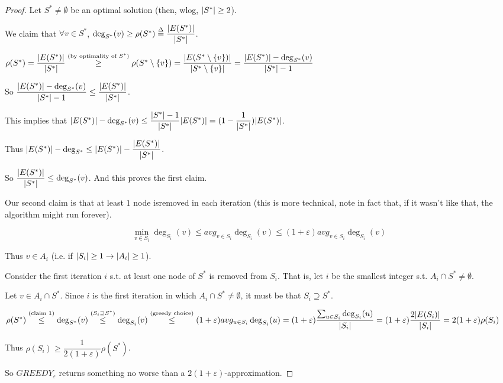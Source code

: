     \begin{proof}
        Let $S^* \neq \emptyset$ be an optimal solution (then, wlog, $\vert S^* \vert \geq 2$).

        We claim that $\forall v \in S^*$, $\deg_{S^*}(v) \geq \rho(S^*) \overset{\Delta}{=} \dfrac{\vert E(S^*) \vert}{\vert S^* \vert}$.

        $\rho(S^*) = \dfrac{\vert E(S^*) \vert}{\vert S^* \vert} \overset{(\text{by optimality of }S^*)}{\geq} \rho(S^* \setminus \{v\}) = 
        \dfrac{\vert E(S^* \setminus \{v\}) \vert}{\vert S^* \setminus \{v\} \vert} = 
        \dfrac{\vert E(S^*) \vert - \deg_{S^*}(v)}{\vert S^* \vert-1}$

        So $\dfrac{\vert E(S^*) \vert - \deg_{S^*}(v)}{\vert S^* \vert-1} \leq \dfrac{\vert E(S^*) \vert}{\vert S^* \vert}$.

        This implies that $\vert E(S^*) \vert - \deg_{S^*}(v) \leq \dfrac{\vert S^* \vert-1}{\vert S^* \vert} \vert E(S^*) \vert = (1 - \dfrac{1}{\vert S^* \vert}) \vert E(S^*) \vert$.

        Thus $\vert E(S^*) \vert - \deg_{S^*} \leq \vert E(S^*) \vert - \dfrac{\vert E(S^*) \vert }{\vert S^* \vert}$.

        So $\dfrac{\vert E(S^*) \vert }{\vert S^* \vert} \leq \deg_{S^*}(v)$. And this proves the first claim.

        Our second claim is that at least $1$ node isremoved in each iteration (this is more technical, note in fact that, if it wasn't like that, the algorithm might run forever).

        \[ \min_{v \in S_i} \deg_{S_i}(v) \leq avg_{v \in S_i} \deg_{S_i}(v) \leq (1+\varepsilon)avg_{v \in S_i} \deg_{S_i}(v) \]

        Thus $v \in A_i$ (i.e. if $\vert S_i \vert \geq 1 \rightarrow \vert A_i \vert \geq 1$).

        Consider the first iteration $i$ s.t. at least one node of $S^*$ is removed from $S_i$.
        That is, let $i$ be the smallest integer s.t. $A_i \cap S^* \neq \emptyset$.

        Let $v \in A_i \cap S^*$. Since $i$ is the first iteration in which $A_i \cap S^* \neq \emptyset$, it must be that $S_i \supseteq S^*$.

        $\rho(S^*) \overset{(\text{claim 1})}{\leq}
        \deg_{S^*}(v) \overset{(S_i \supseteq S^*)}{\leq}
        \deg_{S_i}(v) \overset{(\text{greedy choice})}{\leq}
        (1+\varepsilon) avg_{u \in S_i} \deg_{S_i}(u) = 
        (1+\varepsilon) \dfrac{\sum_{u \in S_i} \deg_{S_i}(u)}{\vert S_i \vert} =
        (1+\varepsilon) \dfrac{2 \vert E(S_i) \vert}{\vert S_i \vert} = 
        2 (1+\varepsilon) \rho(S_i)
        $

        Thus $\rho(S_i) \geq \dfrac{1}{2(1+\varepsilon)} \rho(S^*)$.

        So $GREEDY_\varepsilon$ returns something no worse than a $2(1+\varepsilon)$-approximation.
    \end{proof}